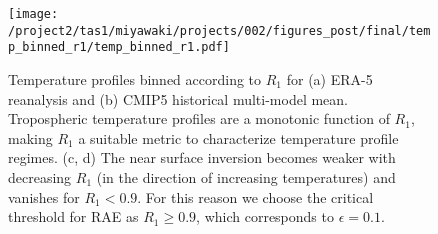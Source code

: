 \documentclass{ametsocV5}
\begin{document}




%

%

\begin{figure}
  \noindent\texttt{[image: /project2/tas1/miyawaki/projects/002/figures\_post/final/temp\_binned\_r1/temp\_binned\_r1.pdf]}\\
  \caption{Temperature profiles binned according to $R_{1}$ for (a) ERA-5 reanalysis and (b) CMIP5 historical multi-model mean. Tropospheric temperature profiles are a monotonic function of $R_{1}$, making $R_{1}$ a suitable metric to characterize temperature profile regimes. (c, d) The near surface inversion becomes weaker with decreasing $R_{1}$ (in the direction of increasing temperatures) and vanishes for $R_{1}<0.9$. For this reason we choose the critical threshold for RAE as $R_{1} \ge 0.9$, which corresponds to $\epsilon=0.1$.}
  \label{fig:temp-binned-r1}
\end{figure}
\end{document}
